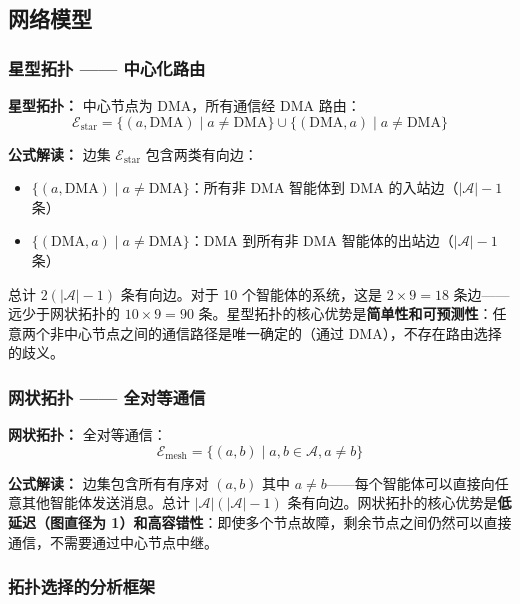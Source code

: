 \documentclass[11pt,a4paper]{ctexart}
\theoremstyle{remark}
\begin{document}
\subsection{网络模型}

\subsubsection{星型拓扑 —— 中心化路由}

\textbf{星型拓扑：} 中心节点为 DMA，所有通信经 DMA 路由：
\begin{equation}
\mathcal{E}_{\text{star}} = \{(a, \text{DMA}) \mid a \neq \text{DMA}\} \cup \{(\text{DMA}, a) \mid a \neq \text{DMA}\}
\end{equation}

\textbf{公式解读：} 边集 $\mathcal{E}_{\text{star}}$ 包含两类有向边：
\begin{itemize}[nosep]
\item $\{(a, \text{DMA}) \mid a \neq \text{DMA}\}$：所有非 DMA 智能体到 DMA 的入站边（$|\mathcal{A}| - 1$ 条）
\item $\{(\text{DMA}, a) \mid a \neq \text{DMA}\}$：DMA 到所有非 DMA 智能体的出站边（$|\mathcal{A}| - 1$ 条）
\end{itemize}
总计 $2(|\mathcal{A}| - 1)$ 条有向边。对于 10 个智能体的系统，这是 $2 \times 9 = 18$ 条边——远少于网状拓扑的 $10 \times 9 = 90$ 条。星型拓扑的核心优势是\textbf{简单性和可预测性}：任意两个非中心节点之间的通信路径是唯一确定的（通过 DMA），不存在路由选择的歧义。

\subsubsection{网状拓扑 —— 全对等通信}

\textbf{网状拓扑：} 全对等通信：
\begin{equation}
\mathcal{E}_{\text{mesh}} = \{(a, b) \mid a, b \in \mathcal{A}, a \neq b\}
\end{equation}

\textbf{公式解读：} 边集包含所有有序对 $(a, b)$ 其中 $a \neq b$——每个智能体可以直接向任意其他智能体发送消息。总计 $|\mathcal{A}|(|\mathcal{A}| - 1)$ 条有向边。网状拓扑的核心优势是\textbf{低延迟（图直径为 1）和高容错性}：即使多个节点故障，剩余节点之间仍然可以直接通信，不需要通过中心节点中继。

\subsubsection{拓扑选择的分析框架}
\end{document}
